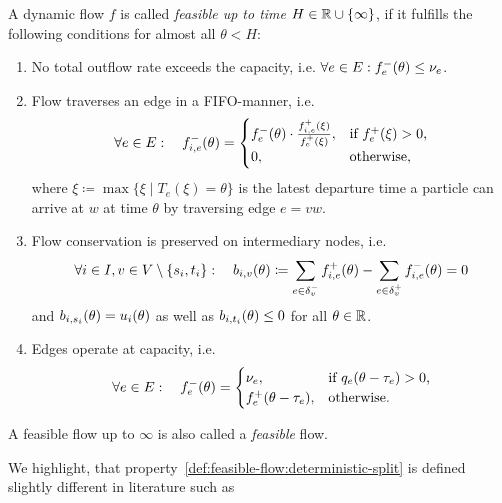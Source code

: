 \begin{definition}\label{def:feasible-flow}
    A dynamic flow $f$ is called \emph{feasible up to time $H\in\mathbb{R} \cup \{\infty \}$}, if it fulfills the following conditions for almost all $\theta < H$:
    \begin{enumerate}[label=(F\arabic*)]
        \item\label{def:feasible-flow:max-capacity} No total outflow rate exceeds the capacity, i.e. $\forall e\in E: {f}^-_e(\theta)\leq \nu_e$.
        \item\label{def:feasible-flow:deterministic-split} Flow traverses an edge in a FIFO-manner, i.e. \[
            \forall e\in E: \quad 
            {f}^-_{i,e}(\theta) = \begin{cases}
                {f}^-_e(\theta) \cdot \frac{{f}^+_{i,e}(\xi)}{{f}^+_e(\xi)}, & \text{if ${f}^+_e(\xi) > 0$,}\\
                0, & \text{otherwise,}
        \end{cases}
        \]
        where $\xi\coloneqq \max \{ \xi  \mid T_e(\xi) = \theta \}$ is the latest departure time a particle can arrive at $w$ at time $\theta$ by traversing edge $e=vw$. 
        \item\label{def:feasible-flow:flow-conservation} Flow conservation is preserved on intermediary nodes, i.e. \[\forall i\in I, v\in V\setminus\{ s_i, t_i \}: \quad
        b_{i,v}(\theta)\coloneqq \sum_{e\in\delta^-_{v}}{f}^+_{i,e}(\theta) - \sum_{e\in\delta^+_{v}} {f}^-_{i,e}(\theta) = 0 \]
        and $b_{i,s_i}(\theta) = u_i(\theta)$ as well as $b_{i,t_i}(\theta) \leq 0$ for all $\theta\in\mathbb{R}$.

        \item\label{def:feasible-flow:operate-at-capacity} Edges operate at capacity, i.e. 
        \[
            \forall e\in E: \quad {f}^-_{e}(\theta) = \begin{cases}
                \nu_e, &\text{if $q_e(\theta - \tau_e)>0$,} \\
                {f}^+_e(\theta-\tau_e), &\text{otherwise.}
            \end{cases}
        \]
    \end{enumerate}
    A feasible flow up to $\infty$ is also called a \emph{feasible} flow.
\end{definition}



\begin{remark}
    We highlight, that property~\ref{def:feasible-flow:deterministic-split} is defined slightly different in literature such as~\cite{}
\end{remark}

